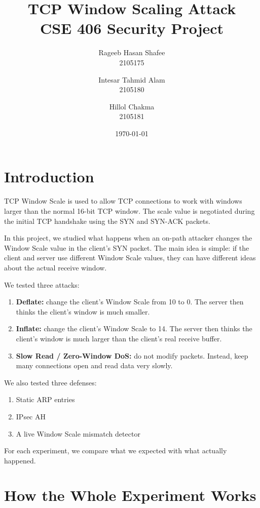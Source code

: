 \documentclass[11pt]{article}
\title{\textbf{TCP Window Scaling Attack} \\ CSE 406 Security Project}
\author{
    Rageeb Hasan Shafee \\
    2105175
    \and
    Intesar Tahmid Alam \\
    2105180
    \and
    Hillol Chakma \\
    2105181
}
\date{\today}
\begin{document}
\maketitle

\section{Introduction}

TCP Window Scale is used to allow TCP connections to work with
windows larger than the normal 16-bit TCP window. The scale value
is negotiated during the initial TCP handshake using the SYN and
SYN-ACK packets.

In this project, we studied what happens when an on-path attacker
changes the Window Scale value in the client's SYN packet. The main
idea is simple: if the client and server use different Window Scale
values, they can have different ideas about the actual receive window.

We tested three attacks:

\begin{enumerate}
    \item \textbf{Deflate:} change the client's Window Scale from
    10 to 0. The server then thinks the client's window is much smaller.

    \item \textbf{Inflate:} change the client's Window Scale to 14.
    The server then thinks the client's window is much larger than
    the client's real receive buffer.

    \item \textbf{Slow Read / Zero-Window DoS:} do not modify packets.
    Instead, keep many connections open and read data very slowly.
\end{enumerate}

We also tested three defenses:

\begin{enumerate}
    \item Static ARP entries
    \item IPsec AH
    \item A live Window Scale mismatch detector
\end{enumerate}

For each experiment, we compare what we expected with what actually
happened.

\section{How the Whole Experiment Works}
\end{document}
